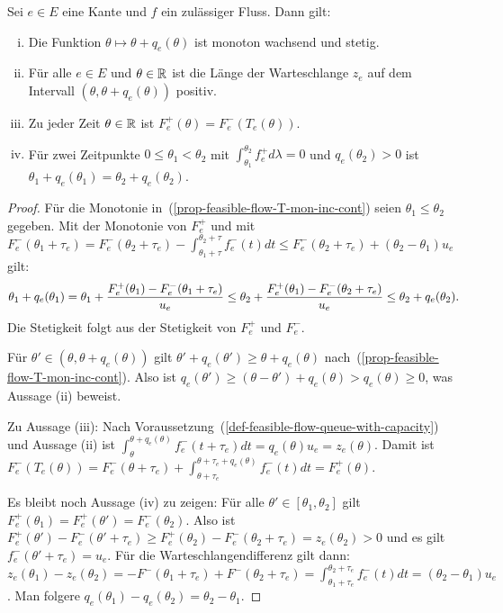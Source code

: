 \begin{proposition}\label{prop-feasible-flow}
	Sei $e\in E$ eine Kante und $f$ ein zulässiger Fluss. Dann gilt:
	\begin{enumerate}[(i)]
		\item\label{prop-feasible-flow-T-mon-inc-cont} Die Funktion $\theta \mapsto \theta + q_e(\theta)$ ist monoton wachsend und stetig.
		\item\label{prop-feasible-flow-positive-queue} Für alle $e\in E$ und $\theta\in\mathbb{R}$ ist die Länge der Warteschlange $z_e$ auf dem Intervall $(\theta, \theta + q_e(\theta))$ positiv.
		\item\label{prop-feasible-flow-det-outflow} Zu jeder Zeit $\theta\in\mathbb{R}$ ist $F_e^+(\theta) = F_e^-(T_e(\theta))$.
		\item\label{prop-feasible-flow-queue-delay} Für zwei Zeitpunkte $0\leq \theta_1 < \theta_2$ mit $\int_{\theta_1}^{\theta_2} f^+_e d\lambda = 0$ und $q_e(\theta_2)>0$ ist $\theta_1 + q_e(\theta_1) = \theta_2 + q_e(\theta_2)$.
	\end{enumerate}
\end{proposition}
\begin{proof}
	Für die Monotonie in~(\ref{prop-feasible-flow-T-mon-inc-cont}) seien $\theta_1 \leq \theta_2$ gegeben.
	Mit der Monotonie von $F_e^+$ und mit $F_e^-(\theta_1 + \tau_e) = F_e^-(\theta_2+\tau_e) - \int_{\theta_1+\tau}^{\theta_2+\tau} f_e^-(t)dt\leq F_e^-(\theta_2 + \tau_e) + (\theta_2 - \theta_1)u_e$ gilt: 
	$$
		\theta_1 + q_e(\theta_1)
		= \theta_1 + \frac{F_e^+(\theta_1) - F_e^-(\theta_1 + \tau_e)}{u_e}\\
		\leq \theta_2 + \frac{F_e^+(\theta_1) - F_e^-(\theta_2+\tau_e)}{u_e} \leq \theta_2 + q_e(\theta_2).
	$$
	Die Stetigkeit folgt aus der Stetigkeit von $F_e^+$ und $F_e^-$.
	
	Für $\theta'\in (\theta, \theta+q_e(\theta))$ gilt $\theta' + q_e(\theta') \geq \theta + q_e(\theta)$ nach~(\ref{prop-feasible-flow-T-mon-inc-cont}).
	Also ist $q_e(\theta') \geq (\theta - \theta') + q_e(\theta) > q_e(\theta)\geq 0$, was Aussage (ii) beweist.	
	
	Zu Aussage (iii): Nach Voraussetzung~(\ref{def-feasible-flow-queue-with-capacity}) und Aussage (ii) ist
	$\int_{\theta}^{\theta + q_e(\theta)}f_e^-(t + \tau_e) dt = q_e(\theta)  u_e = z_e(\theta)$.
	Damit ist $F_e^-(T_e(\theta)) = F_e^-(\theta+\tau_e) + \int_{\theta+\tau_e}^{\theta+\tau_e+q_e(\theta)}f_e^-(t)dt = F_e^+(\theta)$.
	
	Es bleibt noch Aussage (iv) zu zeigen:
	Für alle $\theta'\in [\theta_1, \theta_2]$ gilt $F_e^+(\theta_1) = F_e^+(\theta') = F_e^-(\theta_2)$.
	Also ist $F_e^+(\theta') - F_e^-(\theta' + \tau_e) \geq F_e^+(\theta_2)-F_e^-(\theta_2 + \tau_e) = z_e(\theta_2) > 0$ und es gilt $f_e^-(\theta' + \tau_e)=u_e$.
	Für die Warteschlangendifferenz gilt dann: 
	$z_e(\theta_1)-z_e(\theta_2)=-F^-(\theta_1 + \tau_e) + F^-(\theta_2 + \tau_e) = \int_{\theta_1 + \tau_e}^{\theta_2 + \tau_e} f^-_e(t) dt = (\theta_2 - \theta_1)u_e$.
	Man folgere $q_e(\theta_1) - q_e(\theta_2) = \theta_2 - \theta_1$.
\end{proof}



